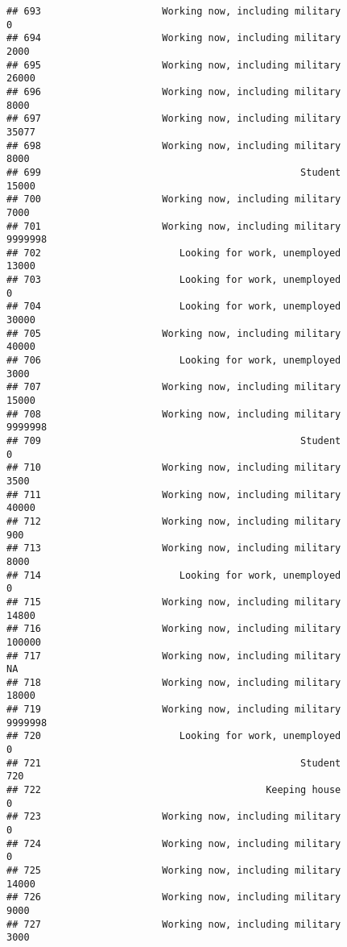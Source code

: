 \documentclass[]{book}
\theoremstyle{definition}
\theoremstyle{definition}
\theoremstyle{remark}
\begin{document}
\begin{verbatim}
## 693                     Working now, including military               0
## 694                     Working now, including military            2000
## 695                     Working now, including military           26000
## 696                     Working now, including military            8000
## 697                     Working now, including military           35077
## 698                     Working now, including military            8000
## 699                                             Student           15000
## 700                     Working now, including military            7000
## 701                     Working now, including military         9999998
## 702                        Looking for work, unemployed           13000
## 703                        Looking for work, unemployed               0
## 704                        Looking for work, unemployed           30000
## 705                     Working now, including military           40000
## 706                        Looking for work, unemployed            3000
## 707                     Working now, including military           15000
## 708                     Working now, including military         9999998
## 709                                             Student               0
## 710                     Working now, including military            3500
## 711                     Working now, including military           40000
## 712                     Working now, including military             900
## 713                     Working now, including military            8000
## 714                        Looking for work, unemployed               0
## 715                     Working now, including military           14800
## 716                     Working now, including military          100000
## 717                     Working now, including military              NA
## 718                     Working now, including military           18000
## 719                     Working now, including military         9999998
## 720                        Looking for work, unemployed               0
## 721                                             Student             720
## 722                                       Keeping house               0
## 723                     Working now, including military               0
## 724                     Working now, including military               0
## 725                     Working now, including military           14000
## 726                     Working now, including military            9000
## 727                     Working now, including military            3000

\end{verbatim}
\end{document}
